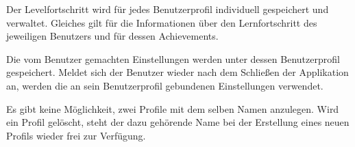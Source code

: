 \begin{requirements}
  		
  	 Der Levelfortschritt wird für jedes Benutzerprofil individuell gespeichert und verwaltet. Gleiches gilt für die Informationen über den Lernfortschritt des jeweiligen Benutzers und für dessen Achievements.
  		
	 Die vom Benutzer gemachten Einstellungen werden unter dessen Benutzerprofil gespeichert.
	Meldet sich der Benutzer wieder nach dem Schließen der Applikation an, werden die an sein Benutzerprofil gebundenen Einstellungen verwendet.
	
	 Es gibt keine Möglichkeit, zwei Profile mit dem selben Namen anzulegen. Wird ein Profil gelöscht, steht der dazu gehörende Name bei der Erstellung eines neuen Profils wieder frei zur Verfügung.

\end{requirements}	
